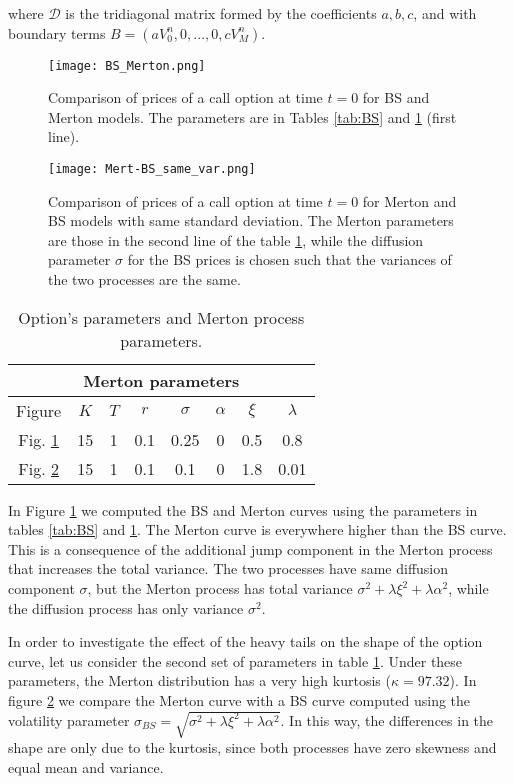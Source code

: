 where $\mathcal{D}$ is the tridiagonal matrix formed by the coefficients $a,b,c$, and with boundary terms $B = (a V^{n}_{0}, 0, ... , 0, c V^{n}_{M})$.  
\begin{figure}[t]
   \centering
   \texttt{[image: BS\_Merton.png]}
   \caption{Comparison of prices of a call option at time $t=0$ for BS and Merton models. The parameters are in Tables \ref{tab:BS} and \ref{tab:Mert} (first line).}
   \label{BS_Merton}
\end{figure}  
\begin{figure}[t]
   \centering
   \texttt{[image: Mert-BS\_same\_var.png]}
   \caption{Comparison of prices of a call option at time $t=0$ for Merton and BS models with same standard deviation. The Merton parameters are those in the second line of
   the table \ref{tab:Mert}, while the diffusion parameter $\sigma$ for the BS prices is chosen such that the variances of the two processes are the same. }
   \label{BS_Merton2} 
 \end{figure}

\begin{table}[t]
  \centering
  \begin{tabular}{cccccccc}
  \toprule
  \multicolumn{8}{c}{Merton parameters} \\
  \midrule
  Figure & $K$ & $T$ & $r$ & $\sigma$ & $\alpha$ &$\xi$ & $\lambda$ \\
  \midrule
  Fig. \ref{BS_Merton} & 15 & 1 & 0.1 & 0.25 & 0 & 0.5 & 0.8 \\
  Fig. \ref{BS_Merton2} & 15 & 1 & 0.1 & 0.1 & 0 & 1.8 & 0.01 \\
  \bottomrule
  \end{tabular}
  \caption{Option's parameters and Merton process parameters.}
  \label{tab:Mert}
\end{table}
In Figure \ref{BS_Merton} we computed the BS and Merton curves using the parameters in tables \ref{tab:BS} and \ref{tab:Mert}. 
The Merton curve is everywhere higher than the BS curve. 
This is a consequence 
of the additional jump component in the Merton process that increases the total variance. 
The two processes have same diffusion component $\sigma$, 
but the Merton process has total variance $\sigma^2 + \lambda \xi^2 +\lambda \alpha^2$, while the diffusion process has only variance $\sigma^2$.

In order to investigate the effect of the heavy tails on the shape of the option curve, let us consider the second set of parameters in table \ref{tab:Mert}. 
Under these parameters, the Merton distribution has a very high kurtosis ($\kappa = 97.32$). 
In figure \ref{BS_Merton2} we compare the Merton curve with a BS curve computed using the volatility parameter 
$\sigma_{BS} = \sqrt{\sigma^2 + \lambda \xi^2 +\lambda \alpha^2 }$. 
In this way, the differences in the shape are only due to the kurtosis, since both processes have zero skewness and equal mean and variance. 

